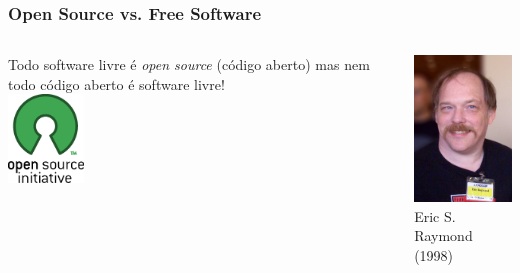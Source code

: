 \documentclass{beamer}
\begin{document}

\begin{frame}
   \frametitle{Open Source vs. Free Software}
   \begin{columns}
     \column{8cm}
     \begin{center}
     Todo software livre é \emph{open source} (código aberto) mas nem todo código aberto é software livre!\\
     \vskip2cm
     \includegraphics[width=2cm]{images/osi-logo.png}
   \end{center}
   \column{3cm}
   \begin{center}
     \includegraphics[width=3cm]{images/esr.jpg}\\
     Eric S. Raymond (1998)
   \end{center}
 \end{columns}
\end{frame}
\end{document}
